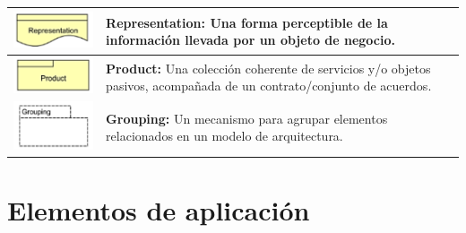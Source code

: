 \begin{longtable}{|c|p{8cm}|}
	\hline
	\includegraphics{anexos/ARCHI/business/representation.png} &
	\textbf{Representation:} Una forma perceptible de la información llevada por un objeto de negocio.                                   \\
	\hline
	\includegraphics{anexos/ARCHI/business/product.png}        &
	\textbf{Product:} Una colección coherente de servicios y/o objetos pasivos, acompañada de un contrato/conjunto de acuerdos.          \\
	\hline
	\includegraphics{anexos/ARCHI/business/grouping.png}       &
	\textbf{Grouping:} Un mecanismo para agrupar elementos relacionados en un modelo de arquitectura.                                    \\
\end{longtable}

\section{Elementos de aplicación}

